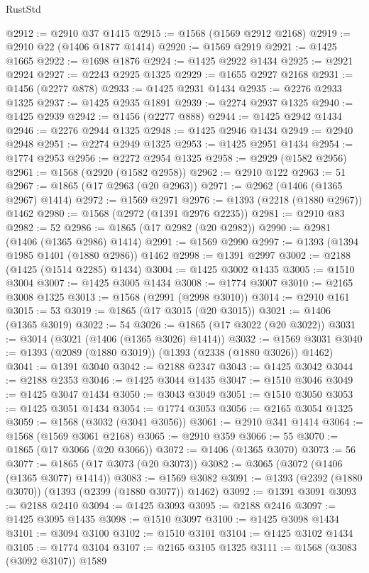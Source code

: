 \begin{lexlean}{RustStd}
\begin{coremodule}
@2912 := @2910 @37 @1415
@2915 := @1568 (@1569 @2912 @2168)
@2919 := @2910 @22 (@1406 @1877 @1414)
@2920 := @1569 @2919
@2921 := @1425 @1665
@2922 := @1698 @1876
@2924 := @1425 @2922 @1434
@2925 := @2921 @2924
@2927 := @2243 @2925 @1325
@2929 := @1655 @2927 @2168
@2931 := @1456 (@2277 @878)
@2933 := @1425 @2931 @1434
@2935 := @2276 @2933 @1325
@2937 := @1425 @2935 @1891
@2939 := @2274 @2937 @1325
@2940 := @1425 @2939
@2942 := @1456 (@2277 @888)
@2944 := @1425 @2942 @1434
@2946 := @2276 @2944 @1325
@2948 := @1425 @2946 @1434
@2949 := @2940 @2948
@2951 := @2274 @2949 @1325
@2953 := @1425 @2951 @1434
@2954 := @1774 @2953
@2956 := @2272 @2954 @1325
@2958 := @2929 (@1582 @2956)
@2961 := @1568 (@2920 (@1582 @2958))
@2962 := @2910 @122
@2963 := 51
@2967 := @1865 (@17 @2963 (@20 @2963))
@2971 := @2962 (@1406 (@1365 @2967) @1414)
@2972 := @1569 @2971
@2976 := @1393 (@2218 (@1880 @2967)) @1462
@2980 := @1568 (@2972 (@1391 @2976 @2235))
@2981 := @2910 @83
@2982 := 52
@2986 := @1865 (@17 @2982 (@20 @2982))
@2990 := @2981 (@1406 (@1365 @2986) @1414)
@2991 := @1569 @2990
@2997 := @1393 (@1394 @1985 @1401 (@1880 @2986)) @1462
@2998 := @1391 @2997
@3002 := @2188 (@1425 (@1514 @2285) @1434)
@3004 := @1425 @3002 @1435
@3005 := @1510 @3004
@3007 := @1425 @3005 @1434
@3008 := @1774 @3007
@3010 := @2165 @3008 @1325
@3013 := @1568 (@2991 (@2998 @3010))
@3014 := @2910 @161
@3015 := 53
@3019 := @1865 (@17 @3015 (@20 @3015))
@3021 := @1406 (@1365 @3019)
@3022 := 54
@3026 := @1865 (@17 @3022 (@20 @3022))
@3031 := @3014 (@3021 (@1406 (@1365 @3026) @1414))
@3032 := @1569 @3031
@3040 := @1393 (@2089 (@1880 @3019)) (@1393 (@2338 (@1880 @3026)) @1462)
@3041 := @1391 @3040
@3042 := @2188 @2347
@3043 := @1425 @3042
@3044 := @2188 @2353
@3046 := @1425 @3044 @1435
@3047 := @1510 @3046
@3049 := @1425 @3047 @1434
@3050 := @3043 @3049
@3051 := @1510 @3050
@3053 := @1425 @3051 @1434
@3054 := @1774 @3053
@3056 := @2165 @3054 @1325
@3059 := @1568 (@3032 (@3041 @3056))
@3061 := @2910 @341 @1414
@3064 := @1568 (@1569 @3061 @2168)
@3065 := @2910 @359
@3066 := 55
@3070 := @1865 (@17 @3066 (@20 @3066))
@3072 := @1406 (@1365 @3070)
@3073 := 56
@3077 := @1865 (@17 @3073 (@20 @3073))
@3082 := @3065 (@3072 (@1406 (@1365 @3077) @1414))
@3083 := @1569 @3082
@3091 := @1393 (@2392 (@1880 @3070)) (@1393 (@2399 (@1880 @3077)) @1462)
@3092 := @1391 @3091
@3093 := @2188 @2410
@3094 := @1425 @3093
@3095 := @2188 @2416
@3097 := @1425 @3095 @1435
@3098 := @1510 @3097
@3100 := @1425 @3098 @1434
@3101 := @3094 @3100
@3102 := @1510 @3101
@3104 := @1425 @3102 @1434
@3105 := @1774 @3104
@3107 := @2165 @3105 @1325
@3111 := @1568 (@3083 (@3092 @3107)) @1589

\end{coremodule}
\end{lexlean}
